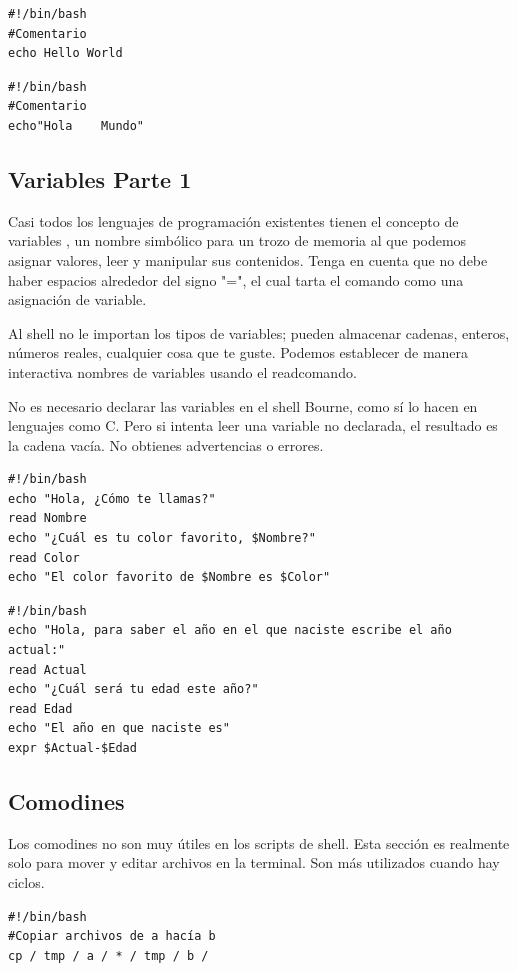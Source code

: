 \documentclass{article}
\begin{document}
\begin{verbatim}
#!/bin/bash
#Comentario
echo Hello World
\end{verbatim}

\begin{verbatim}
#!/bin/bash
#Comentario
echo"Hola    Mundo"
\end{verbatim}

\subsection{Variables Parte 1}
Casi todos los lenguajes de programación existentes tienen el concepto de variables , un nombre simbólico para un trozo de memoria al que podemos asignar valores, leer y manipular sus contenidos.
Tenga en cuenta que no debe haber espacios alrededor del signo "=", el cual tarta el comando como una asignación de variable.

Al shell no le importan los tipos de variables; pueden almacenar cadenas, enteros, números reales, cualquier cosa que te guste. Podemos establecer de manera interactiva nombres de variables usando el readcomando.

No es necesario declarar las variables en el shell Bourne, como sí lo hacen en lenguajes como C. Pero si intenta leer una variable no declarada, el resultado es la cadena vacía. No obtienes advertencias o errores.

\begin{verbatim}
#!/bin/bash
echo "Hola, ¿Cómo te llamas?"
read Nombre
echo "¿Cuál es tu color favorito, $Nombre?"
read Color
echo "El color favorito de $Nombre es $Color"
\end{verbatim}

\begin{verbatim}
#!/bin/bash
echo "Hola, para saber el año en el que naciste escribe el año actual:"
read Actual
echo "¿Cuál será tu edad este año?"
read Edad
echo "El año en que naciste es"
expr $Actual-$Edad
\end{verbatim}

\subsection{Comodines}
Los comodines no son muy útiles en los scripts de shell. Esta sección es realmente solo para mover y editar archivos en la terminal. Son más utilizados cuando hay ciclos.
\begin{verbatim}
#!/bin/bash
#Copiar archivos de a hacía b
cp / tmp / a / * / tmp / b /
\end{verbatim}
\end{document}
